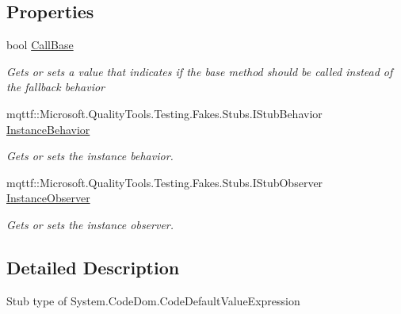 \subsection*{Properties}
\begin{DoxyCompactItemize}
\item 
bool \hyperlink{class_system_1_1_code_dom_1_1_fakes_1_1_stub_code_default_value_expression_a03ca6db45408e2020a0243962d01e694}{Call\-Base}
\begin{DoxyCompactList}\small\item\em Gets or sets a value that indicates if the base method should be called instead of the fallback behavior\end{DoxyCompactList}\item 
mqttf\-::\-Microsoft.\-Quality\-Tools.\-Testing.\-Fakes.\-Stubs.\-I\-Stub\-Behavior \hyperlink{class_system_1_1_code_dom_1_1_fakes_1_1_stub_code_default_value_expression_adb70ddc39e580847f86cee841181dcd4}{Instance\-Behavior}
\begin{DoxyCompactList}\small\item\em Gets or sets the instance behavior.\end{DoxyCompactList}\item 
mqttf\-::\-Microsoft.\-Quality\-Tools.\-Testing.\-Fakes.\-Stubs.\-I\-Stub\-Observer \hyperlink{class_system_1_1_code_dom_1_1_fakes_1_1_stub_code_default_value_expression_ab5fa985309ec609b92cec8325cb3ca22}{Instance\-Observer}
\begin{DoxyCompactList}\small\item\em Gets or sets the instance observer.\end{DoxyCompactList}\end{DoxyCompactItemize}


\subsection{Detailed Description}
Stub type of System.\-Code\-Dom.\-Code\-Default\-Value\-Expression




